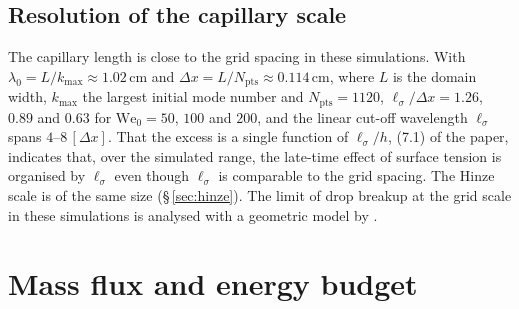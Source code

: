 \documentclass[11pt]{article}
\newcommand{\We}{\mathrm{We}_0}
\newcommand{\lls}{\ell_\sigma}
\begin{document}
\subsection{Resolution of the capillary scale}\label{sec:resolution}

The capillary length is close to the grid spacing in these simulations. With $\lambda_0 = L/k_{\max} \approx 1.02$\,cm and $\Delta x = L/N_\mathrm{pts} \approx 0.114$\,cm, where $L$ is the domain width, $k_{\max}$ the largest initial mode number and $N_\mathrm{pts} = 1120$, $\lls/\Delta x = 1.26$, $0.89$ and $0.63$ for $\We = 50$, $100$ and $200$, and the linear cut-off wavelength $\lls$ spans $4$--$8 \, [\Delta x]$. That the excess is a single function of $\lls/h$, (7.1) of the paper, indicates that, over the simulated range, the late-time effect of surface tension is organised by $\lls$ even though $\lls$ is comparable to the grid spacing. The Hinze scale is of the same size (\S\,\ref{sec:hinze}). The limit of drop breakup at the grid scale in these simulations is analysed with a geometric model by \citet{Walker2027_2}.

\section{Mass flux and energy budget}\label{sec:massflux}
\end{document}
